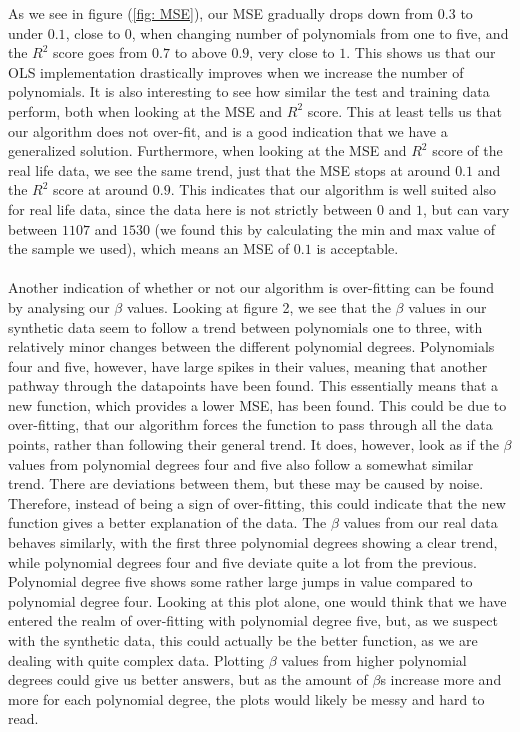 \documentclass[english,notitlepage,reprint,nofootinbib]{revtex4-1}  %
\begin{document}
As we see in figure (\ref{fig: MSE}), our MSE gradually drops down from $0.3$ to under $0.1$, close to $0$, when changing number of polynomials from one to five, and the $R^2$ score goes from $0.7$ to above $0.9$, very close to $1$. This shows us that our OLS implementation drastically improves when we increase the number of polynomials. It is also interesting to see how similar the test and training data perform, both when looking at the MSE and $R^2$ score. This at least tells us that our algorithm does not over-fit, and is a good indication that we have a generalized solution. Furthermore, when looking at the MSE and $R^2$ score of the real life data, we see the same trend, just that the MSE stops at around $0.1$ and the $R^2$ score at around $0.9$. This indicates that our algorithm is well suited also for real life data, since the data here is not strictly between $0$ and $1$, but can vary between $1107$ and $1530$ (we found this by calculating the min and max value of the sample we used), which means an MSE of $0.1$ is acceptable.
\\
\\
Another indication of whether or not our algorithm is over-fitting can be found by analysing our $\beta$ values. Looking at figure 2, we see that the $\beta$ values in our synthetic data seem to follow a trend between polynomials one to three, with relatively minor changes between the different polynomial degrees. Polynomials four and five, however, have large spikes in their values, meaning that another pathway through the datapoints have been found. This essentially means that a new function, which provides a lower MSE, has been found. This could be due to over-fitting, that our algorithm forces the function to pass through all the data points, rather than following their general trend. It does, however, look as if the $\beta$ values from polynomial degrees four and five also follow a somewhat similar trend. There are deviations between them, but these may be caused by noise. Therefore, instead of being a sign of over-fitting, this could indicate that the new function gives a better explanation of the data. 
The $\beta$ values from our real data behaves similarly, with the first three polynomial degrees showing a clear trend, while polynomial degrees four and five deviate quite a lot from the previous. Polynomial degree five shows some rather large jumps in value compared to polynomial degree four. Looking at this plot alone, one would think that we have entered the realm of over-fitting with polynomial degree five, but, as we suspect with the synthetic data, this could actually be the better function, as we are dealing with quite complex data. Plotting $\beta$ values from higher polynomial degrees could give us better answers, but as the amount of $\beta$s increase more and more for each polynomial degree, the plots would likely be messy and hard to read. 
\end{document}
